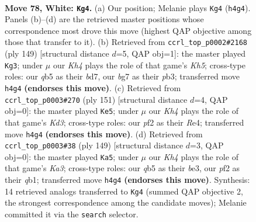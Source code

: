 \documentclass[11pt]{article}
\begin{document}
\clearpage

\begin{figure}[p]\centering
\begin{subfigure}{0.46\textwidth}\centering
\resizebox{\linewidth}{!}{%
\newchessgame
\chessboard[
  setfen={8/2k3b1/8/1q6/7K/8/5p2/8 w - - 0 78},
  showmover=false,
  pgfstyle=straightmove, color=movearrow, markmove={h4-g4}
]}
\caption{}
\end{subfigure}\hfill
\begin{subfigure}{0.46\textwidth}\centering
\resizebox{\linewidth}{!}{%
\newchessgame
\chessboard[
  setfen={8/3B4/8/8/1p5k/1P6/8/2b3K1 b - - 13 75},
  showmover=false,
  pgfstyle=straightmove, color=movearrow, markmove={h4-g3}
]}
\caption{}
\end{subfigure}
\\[4pt]
\begin{subfigure}{0.46\textwidth}\centering
\resizebox{\linewidth}{!}{%
\newchessgame
\chessboard[
  setfen={8/8/3k2K1/8/4r3/1Q6/8/8 b - - 10 76},
  showmover=false,
  pgfstyle=straightmove, color=movearrow, markmove={d6-e5}
]}
\caption{}
\end{subfigure}\hfill
\begin{subfigure}{0.46\textwidth}\centering
\resizebox{\linewidth}{!}{%
\newchessgame
\chessboard[
  setfen={8/6K1/k7/8/8/4B3/8/1Q6 b - - 0 75},
  showmover=false,
  pgfstyle=straightmove, color=movearrow, markmove={a6-a5}
]}
\caption{}
\end{subfigure}
\caption{\textbf{Move 78, White: \texttt{Kg4}.} (a) Our position; Melanie plays \texttt{Kg4} (\texttt{h4g4}). Panels (b)--(d) are the retrieved master positions whose correspondence most drove this move (highest QAP objective among those that transfer to it). (b) Retrieved from \texttt{ccrl\_top\_p0002\#2168} (ply 149) [structural distance $d$=5, QAP obj=1]: the master played \texttt{Kg3}; under $\mu$ our \emph{Kh4} plays the role of that game's \emph{Kh5}; cross-type roles: our \emph{q}b5 as their \emph{b}d7, our \emph{b}g7 as their \emph{p}b3; transferred move \texttt{h4g4} \textbf{(endorses this move)}. (c) Retrieved from \texttt{ccrl\_top\_p0003\#270} (ply 151) [structural distance $d$=4, QAP obj=0]: the master played \texttt{Ke5}; under $\mu$ our \emph{Kh4} plays the role of that game's \emph{Kd3}; cross-type roles: our \emph{p}f2 as their \emph{R}e4; transferred move \texttt{h4g4} \textbf{(endorses this move)}. (d) Retrieved from \texttt{ccrl\_top\_p0003\#38} (ply 149) [structural distance $d$=3, QAP obj=0]: the master played \texttt{Ka5}; under $\mu$ our \emph{Kh4} plays the role of that game's \emph{Ka3}; cross-type roles: our \emph{q}b5 as their \emph{b}e3, our \emph{p}f2 as their \emph{q}b1; transferred move \texttt{h4g4} \textbf{(endorses this move)}. Synthesis: 14 retrieved analogs transferred to \texttt{Kg4} (summed QAP objective 2, the strongest correspondence among the candidate moves); Melanie committed it via the \texttt{search} selector.}
\label{fig:thought-m154}
\end{figure}
\end{document}
